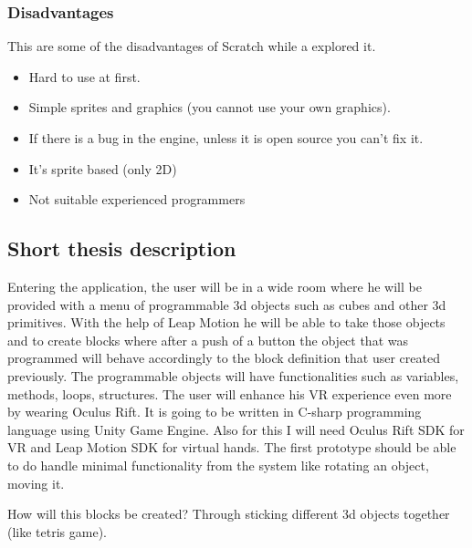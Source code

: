 \subsubsection{Disadvantages}
This are some of the disadvantages of Scratch while a explored it.
\begin{itemize}

\item Hard to use at first.
\item Simple sprites and graphics (you cannot use your own graphics).
\item If there is a bug in the engine, unless it is open source you can't fix it.
\item It's sprite based (only 2D)
\item Not suitable experienced programmers
	 
\end{itemize}



\subsection{Short thesis description}
Entering the application, the user will be in a wide room where he will be provided with a menu of programmable 3d objects such as cubes and other 3d primitives. With the help of Leap Motion he will be able to take those objects and to create blocks where after a push of a button the object that was programmed will behave accordingly to the block definition that user created previously. The programmable objects will have functionalities such as variables, methods, loops, structures. The user will enhance his VR experience even more by wearing Oculus Rift. It is going to be written in C-sharp programming language using Unity Game Engine. Also for this I will need Oculus Rift SDK for VR and Leap Motion SDK for virtual hands. The first prototype should be able to do handle minimal functionality from the system like rotating an object, moving it.

How will this blocks be created? Through sticking different 3d objects together (like tetris game).

